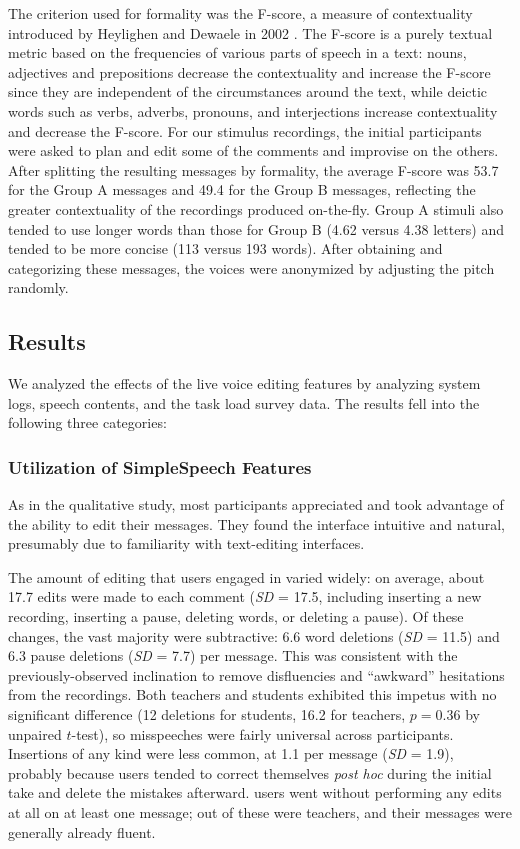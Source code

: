 The criterion used for formality was the F-score, a measure of contextuality introduced by Heylighen and Dewaele in 2002 \cite{heylighen}.
The F-score is a purely textual metric based on the frequencies of various parts of speech in a text: nouns, adjectives and prepositions decrease the contextuality and increase the F-score since they are independent of the circumstances around the text, while deictic words such as verbs, adverbs, pronouns, and interjections increase contextuality and decrease the F-score. 
For our stimulus recordings, the initial participants were asked to plan and edit some of the comments and improvise on the others.
After splitting the resulting messages by formality, the average F-score was 53.7 for the Group A messages and 49.4 for the Group B messages, reflecting the greater contextuality of the recordings produced on-the-fly.
Group A stimuli also tended to use longer words than those for Group B (4.62 versus 4.38 letters) and tended to be more concise (113 versus 193 words).
After obtaining and categorizing these messages, the voices were anonymized by adjusting the pitch randomly.

\subsection{Results}
We analyzed the effects of the live voice editing features by analyzing system logs, speech contents, and the task load survey data. The results fell into the following three categories:

\subsubsection{Utilization of SimpleSpeech Features}
As in the qualitative study, most participants appreciated and took advantage of the ability to edit their messages. They found the interface intuitive and natural, presumably due to familiarity with text-editing interfaces. 

The amount of editing that users engaged in varied widely: on average, about 17.7 edits were made to each comment (\textit{SD} = 17.5, including inserting a new recording, inserting a pause, deleting words, or deleting a pause). 
Of these changes, the vast majority were subtractive: 6.6 word deletions (\textit{SD} = 11.5) and 6.3 pause deletions (\textit{SD} = 7.7) per message.
This was consistent with the previously-observed inclination to remove disfluencies and ``awkward'' hesitations from the recordings.
Both teachers and students exhibited this impetus with no significant difference (12 deletions for students, 16.2 for teachers, $p=0.36$ by unpaired $t$-test), so misspeeches were fairly universal across participants.
Insertions of any kind were less common, at 1.1 per message (\textit{SD} = 1.9), probably because users tended to correct themselves \emph{post hoc} during the initial take and delete the mistakes afterward.
 users went without performing any edits at all on at least one message;  out of these were teachers, and their messages were generally already fluent.

